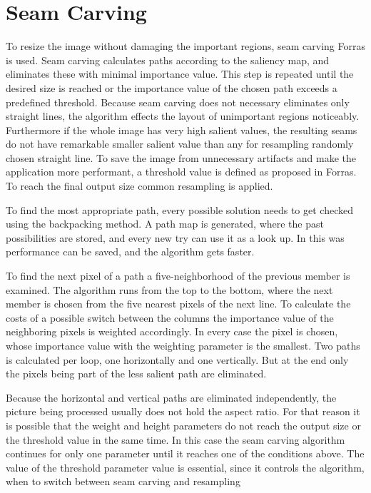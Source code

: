 \documentclass[draft,final]{vutinfth} %
\begin{document}
	\section{Seam Carving}
	To resize the image without damaging the important regions, seam carving Forras is used.
	Seam carving calculates paths according to the saliency map, and eliminates these with minimal importance value.
	This step is repeated until the desired size is reached or the importance value of the chosen path exceeds a predefined threshold.
	Because seam carving does not necessary eliminates only straight lines, the algorithm effects the layout of unimportant regions noticeably.
	Furthermore if the whole image has very high salient values, the resulting seams do not have remarkable smaller salient value than any  for resampling randomly chosen straight line.
	To save the image from unnecessary artifacts and make the application more performant, a threshold value is defined as proposed in Forras.
	To reach the final output size common resampling is applied.\par 
	To find the most appropriate path, every possible solution needs to get checked using the backpacking method.
	A path map is generated, where the past possibilities are stored, and every new try can use it as a look up.
	In this was performance can be saved, and the algorithm gets faster.\par 
	To find the next pixel of a path a five-neighborhood of the previous member is examined.
	The algorithm runs from the top to the bottom, where the next member is chosen from the five nearest pixels of the next line.
	To calculate the costs of a possible switch between the columns the importance value of the neighboring pixels is weighted accordingly.
	In every case the pixel is chosen, whose importance value with the weighting parameter is the smallest.
	Two paths is calculated per loop, one horizontally and one vertically.
	But at the end only the pixels being part of the less salient path are eliminated.\par 
	Because the horizontal and vertical paths are eliminated independently, the picture being processed usually does not hold the aspect ratio.
	For that reason it is possible that the weight and height parameters do not reach the output size or the threshold value in the same time.
	In this case the seam carving algorithm continues for only one parameter until it reaches one of the conditions above. 
    The value of the threshold parameter value is essential,	since it controls the algorithm, when to switch between seam carving and resampling 
\end{document}
